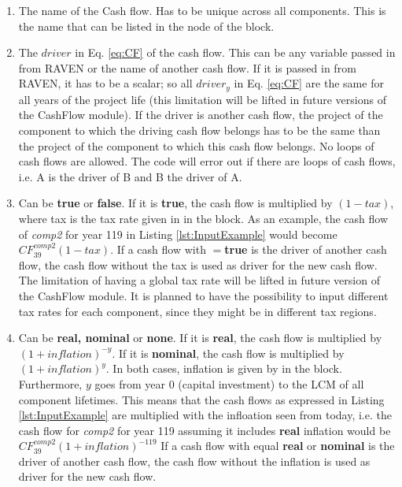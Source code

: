 \begin{enumerate}
  \begin{enumerate}
  \item[\xmlAttr{name}] The name of the Cash flow. Has to be unique across all components. This is the name that can be listed in the  node of the  block.
  \item[\xmlAttr{driver}] The $driver$ in Eq. \ref{eq:CF} of the cash flow. This can be any variable passed in from RAVEN or the name of another cash flow. If it is passed in from RAVEN, it has to be a scalar;
 so all $driver_{y}$ in Eq. \ref{eq:CF}  are the same for all years of the project life (this limitation will be lifted in future versions of the CashFlow module). If the driver is another
 cash flow, the project  of the component to which the driving cash flow belongs has to be the same than the project  of the component to which this
 cash flow belongs. No loops of cash flows are allowed. The code will error out if there are loops of cash flows, i.e. A is the driver of B and B the driver of A.
  \item[\xmlAttr{tax}] Can be \textbf{true} or \textbf{false}. If it is \textbf{true}, the cash flow is multiplied by $(1-tax)$, where tax is the tax rate given in  in the 
 block. As an example, the cash flow of \textit{comp2} for year 119 in Listing \ref{lst:InputExample} would become $CF^{comp2}_{39}(1-tax)$.  If a cash flow with $=$\textbf{true} is the driver of another cash flow, the cash flow without the tax is used as driver for the new cash flow. 
The limitation of having a global tax rate will be lifted in future version of the CashFlow module. It is planned to have the possibility to input different tax rates for each component, since they might be in different tax regions.
  \item[\xmlAttr{inflation}] Can be \textbf{real, nominal} or \textbf{none}. If it is \textbf{real}, the cash flow is multiplied by $(1+inflation)^{-y}$. If it is \textbf{nominal}, the cash flow is multiplied by $(1+inflation)^y$. 
In both cases, inflation is given by  in the  block. Furthermore, $y$ goes from year 0 (capital investment) to the LCM of all component lifetimes.
This means that the cash flows as expressed in Listing \ref{lst:InputExample} are multiplied with the infloation seen from today, i.e. the cash flow for \textit{comp2} for year 119 assuming it includes \textbf{real}
inflation would be $CF^{comp2}_{39}(1+inflation)^{-119}$
 If a cash flow with  equal \textbf{real} or \textbf{nominal} is the driver of another cash flow, the cash flow without the inflation is used as driver for the new cash flow.

\end{enumerate}
\end{enumerate}
